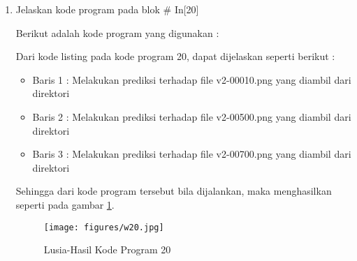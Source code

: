 \begin{enumerate}
\item Jelaskan kode program pada blok \# In[20]
	\par Berikut adalah kode program yang digunakan :
	
	\par Dari kode listing pada kode program 20, dapat dijelaskan seperti berikut :
	\begin{itemize}
	\item Baris 1	: Melakukan prediksi terhadap file v2-00010.png yang diambil dari direktori
	\item Baris 2	: Melakukan prediksi terhadap file v2-00500.png yang diambil dari direktori
	\item Baris 3	: Melakukan prediksi terhadap file v2-00700.png yang diambil dari direktori
	\end{itemize}
	\par Sehingga dari kode program tersebut bila dijalankan, maka menghasilkan seperti pada gambar \ref{7B20}.
		\begin{figure}[!hbtp]
		\centering
		\texttt{[image: figures/w20.jpg]}
		\caption{Lusia-Hasil Kode Program 20}
		\label{7B20}
		\end{figure}

\end{enumerate}

